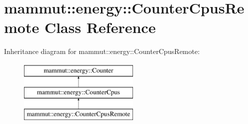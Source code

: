 \hypertarget{classmammut_1_1energy_1_1CounterCpusRemote}{\section{mammut\-:\-:energy\-:\-:Counter\-Cpus\-Remote Class Reference}
\label{classmammut_1_1energy_1_1CounterCpusRemote}
}
Inheritance diagram for mammut\-:\-:energy\-:\-:Counter\-Cpus\-Remote\-:\begin{figure}[H]
\begin{center}
\leavevmode
\includegraphics[height=3.000000cm]{classmammut_1_1energy_1_1CounterCpusRemote}
\end{center}
\end{figure}
